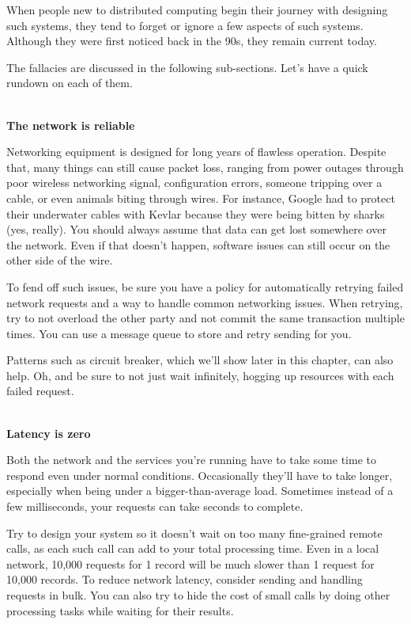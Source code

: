 
When people new to distributed computing begin their journey with designing such systems, they tend to forget or ignore a few aspects of such systems. Although they were first noticed back in the 90s, they remain current today.

The fallacies are discussed in the following sub-sections. Let's have a quick rundown on each of them.

\hspace*{\fill} \\ %
\noindent
\textbf{The network is reliable}

Networking equipment is designed for long years of flawless operation. Despite that, many things can still cause packet loss, ranging from power outages through poor wireless networking signal, configuration errors, someone tripping over a cable, or even animals biting through wires. For instance, Google had to protect their underwater cables with Kevlar because they were being bitten by sharks (yes, really). You should always assume that data can get lost somewhere over the network. Even if that doesn't happen, software issues can still occur on the other side of the wire.

To fend off such issues, be sure you have a policy for automatically retrying failed network requests and a way to handle common networking issues. When retrying, try to not overload the other party and not commit the same transaction multiple times. You can use a message queue to store and retry sending for you.

Patterns such as circuit breaker, which we'll show later in this chapter, can also help. Oh, and be sure to not just wait infinitely, hogging up resources with each failed request.

\hspace*{\fill} \\ %
\noindent
\textbf{Latency is zero}

Both the network and the services you're running have to take some time to respond even under normal conditions. Occasionally they'll have to take longer, especially when being under a bigger-than-average load. Sometimes instead of a few milliseconds, your requests can take seconds to complete.

Try to design your system so it doesn't wait on too many fine-grained remote calls, as each such call can add to your total processing time. Even in a local network, 10,000 requests for 1 record will be much slower than 1 request for 10,000 records. To reduce network latency, consider sending and handling requests in bulk. You can also try to hide the cost of small calls by doing other processing tasks while waiting for their results.

